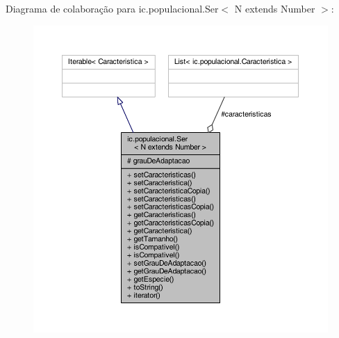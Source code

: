 Diagrama de colaboração para ic.\-populacional.\-Ser$<$ N extends Number $>$\-:\nopagebreak
\begin{figure}[H]
\begin{center}
\leavevmode
\includegraphics[width=350pt]{classic_1_1populacional_1_1_ser_3_01_n_01extends_01_number_01_4__coll__graph}
\end{center}
\end{figure}
